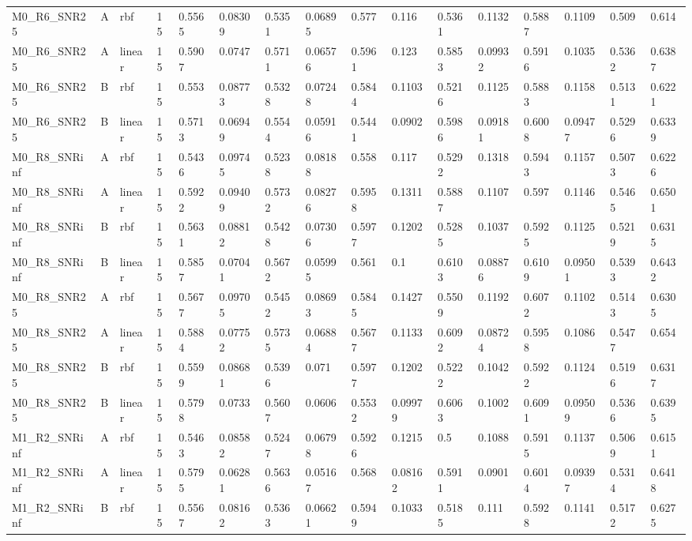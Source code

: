 \begin{tabular}{llllllllllllllll}
M0\_R6\_SNR25 & A & rbf & 15 & 0.5565 & 0.08309 & 0.5351 & 0.06895 & 0.577 & 0.116 & 0.5361 & 0.1132 & 0.5887 & 0.1109 & 0.509 & 0.614 \\
M0\_R6\_SNR25 & A & linear & 15 & 0.5907 & 0.0747 & 0.5711 & 0.06576 & 0.5961 & 0.123 & 0.5853 & 0.09932 & 0.5916 & 0.1035 & 0.5362 & 0.6387 \\
M0\_R6\_SNR25 & B & rbf & 15 & 0.553 & 0.08773 & 0.5328 & 0.07248 & 0.5844 & 0.1103 & 0.5216 & 0.1125 & 0.5883 & 0.1158 & 0.5131 & 0.6221 \\
M0\_R6\_SNR25 & B & linear & 15 & 0.5713 & 0.06949 & 0.5544 & 0.05916 & 0.5441 & 0.0902 & 0.5986 & 0.09181 & 0.6008 & 0.09477 & 0.5296 & 0.6339 \\
M0\_R8\_SNRinf & A & rbf & 15 & 0.5436 & 0.09745 & 0.5238 & 0.08188 & 0.558 & 0.117 & 0.5292 & 0.1318 & 0.5943 & 0.1157 & 0.5073 & 0.6226 \\
M0\_R8\_SNRinf & A & linear & 15 & 0.5922 & 0.09409 & 0.5732 & 0.08276 & 0.5958 & 0.1311 & 0.5887 & 0.1107 & 0.597 & 0.1146 & 0.5465 & 0.6501 \\
M0\_R8\_SNRinf & B & rbf & 15 & 0.5631 & 0.08812 & 0.5428 & 0.07306 & 0.5977 & 0.1202 & 0.5285 & 0.1037 & 0.5925 & 0.1125 & 0.5219 & 0.6315 \\
M0\_R8\_SNRinf & B & linear & 15 & 0.5857 & 0.07041 & 0.5672 & 0.05995 & 0.561 & 0.1 & 0.6103 & 0.08876 & 0.6109 & 0.09501 & 0.5393 & 0.6432 \\
M0\_R8\_SNR25 & A & rbf & 15 & 0.5677 & 0.09705 & 0.5452 & 0.08693 & 0.5845 & 0.1427 & 0.5509 & 0.1192 & 0.6072 & 0.1102 & 0.5143 & 0.6305 \\
M0\_R8\_SNR25 & A & linear & 15 & 0.5884 & 0.07752 & 0.5735 & 0.06884 & 0.5677 & 0.1133 & 0.6092 & 0.08724 & 0.5958 & 0.1086 & 0.5477 & 0.654 \\
M0\_R8\_SNR25 & B & rbf & 15 & 0.5599 & 0.08681 & 0.5396 & 0.071 & 0.5977 & 0.1202 & 0.5222 & 0.1042 & 0.5922 & 0.1124 & 0.5196 & 0.6317 \\
M0\_R8\_SNR25 & B & linear & 15 & 0.5798 & 0.0733 & 0.5607 & 0.0606 & 0.5532 & 0.09979 & 0.6063 & 0.1002 & 0.6091 & 0.09509 & 0.5366 & 0.6395 \\
M1\_R2\_SNRinf & A & rbf & 15 & 0.5463 & 0.08582 & 0.5247 & 0.06798 & 0.5926 & 0.1215 & 0.5 & 0.1088 & 0.5915 & 0.1137 & 0.5069 & 0.6151 \\
M1\_R2\_SNRinf & A & linear & 15 & 0.5795 & 0.06281 & 0.5636 & 0.05167 & 0.568 & 0.08162 & 0.5911 & 0.0901 & 0.6014 & 0.09397 & 0.5314 & 0.6418 \\
M1\_R2\_SNRinf & B & rbf & 15 & 0.5567 & 0.08162 & 0.5363 & 0.06621 & 0.5949 & 0.1033 & 0.5185 & 0.111 & 0.5928 & 0.1141 & 0.5172 & 0.6275 \\

\end{tabular}
